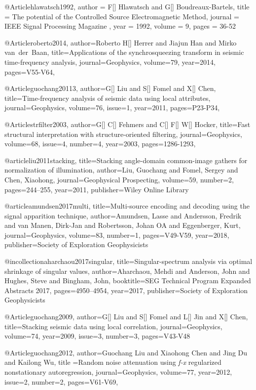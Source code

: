 @Article{hlawatsch1992,
  author = 	 {F[] Hlawatsch and G[] Boudreaux-Bartels},
  title = 	 {The potential of the Controlled Source Electromagnetic Method},
  journal = 	 { IEEE Signal Processing Magazine },
  year = 	 1992,
  volume = 	 9,
  pages = 	 {36-52}
}

@Article{roberto2014,
author={Roberto H[] Herrer and Jiajun Han and Mirko van~der~Baan},
title={Applications of the synchrosqueezing transform
in seismic time-frequency analysis},
journal={Geophysics},
volume=79,
year=2014,
pages={V55-V64},
}

@Article{guochang20113,
author={G[] Liu and S[] Fomel and X[] Chen},
title={Time-frequency analysis of seismic data using local attributes},
journal={Geophysics},
volume=76,
issue=1,
year=2011,
pages={P23-P34},
}

@Article{strfilter2003,
author={G[] C[] Fehmers and C[] F[] W[] Hocker},
title={Fast structural interpretation with structure-oriented filtering},
journal={Geophysics},
volume=68,
issue=4,
number=4,
year=2003,
pages={1286-1293},
}




@article{liu2011stacking,
  title={Stacking angle-domain common-image gathers for normalization of illumination},
  author={Liu, Guochang and Fomel, Sergey and Chen, Xiaohong},
  journal={Geophysical Prospecting},
  volume={59},
  number={2},
  pages={244--255},
  year={2011},
  publisher={Wiley Online Library}
}

@article{amundsen2017multi,
  title={Multi-source encoding and decoding using the signal apparition technique},
  author={Amundsen, Lasse and Andersson, Fredrik and van Manen, Dirk-Jan and Robertsson, Johan OA and Eggenberger, Kurt},
  journal={Geophysics},
  volume={83},
  number={1},
  pages={V49-V59},
  year={2018},
  publisher={Society of Exploration Geophysicists}
}


@incollection{aharchaou2017singular,
  title={Singular-spectrum analysis via optimal shrinkage of singular values},
  author={Aharchaou, Mehdi and Anderson, John and Hughes, Steve and Bingham, John},
  booktitle={SEG Technical Program Expanded Abstracts 2017},
  pages={4950--4954},
  year={2017},
  publisher={Society of Exploration Geophysicists}
}


@Article{guochang2009,
author={G[] Liu and S[] Fomel and L[] Jin and X[] Chen},
title={Stacking seismic data using local correlation},
journal={Geophysics},
volume=74,
year=2009,
issue=3,
number=3,
pages={V43-V48}
}

@Article{guochang2012,
  author={Guochang Liu and Xiaohong Chen and Jing Du and Kailong Wu},
  title ={Random noise attenuation using \emph{f-x} regularized nonstationary autoregression},
  journal={Geophysics},
  volume=77,
  year=2012,
  issue=2,
  number=2,
  pages={V61-V69},
}

